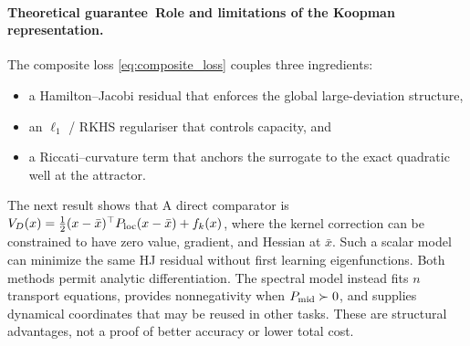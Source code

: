 \documentclass[11pt]{article}
\theoremstyle{plain}      %
\theoremstyle{definition} %
\providecommand{\DIFaddtex}[1]{{\protect\color{blue}#1}} %
\providecommand{\DIFdeltex}[1]{{\protect\color{red}#1}} %
\providecommand{\DIFaddbegin}{} %
\providecommand{\DIFaddend}{} %
\providecommand{\DIFdelbegin}{} %
\providecommand{\DIFdelend}{} %
\providecommand{\DIFadd}[1]{\texorpdfstring{\DIFaddtex{#1}}{#1}} %
\providecommand{\DIFdel}[1]{\texorpdfstring{\DIFdeltex{#1}}{}} %
\newcommand{\DIFscaledelfig}{1.0}
\newlength{\DIFdelgraphicswidth} %
\newlength{\DIFdelgraphicsheight} %
\newcommand{\DIFaddincludegraphics}[2][]{{\color{blue}\fbox{\DIFOincludegraphics[#1]{#2}}}} %
\newcommand{\DIFdelincludegraphics}[2][]{%
\sbox{\DIFdelgraphicsbox}{\DIFOincludegraphics[#1]{#2}}%
\settoboxwidth{\DIFdelgraphicswidth}{\DIFdelgraphicsbox} %
\settoboxtotalheight{\DIFdelgraphicsheight}{\DIFdelgraphicsbox} %
\scalebox{\DIFscaledelfig}{%
\parbox[b]{\DIFdelgraphicswidth}{\usebox{\DIFdelgraphicsbox}\\[-\baselineskip] \rule{\DIFdelgraphicswidth}{0em}}\llap{\resizebox{\DIFdelgraphicswidth}{\DIFdelgraphicsheight}{%
\setlength{\unitlength}{\DIFdelgraphicswidth}%
\begin{picture}(1,1)%
\thicklines\linethickness{2pt} %
{\color[rgb]{1,0,0}\put(0,0){\framebox(1,1){}}}%
{\color[rgb]{1,0,0}\put(0,0){\line( 1,1){1}}}%
{\color[rgb]{1,0,0}\put(0,1){\line(1,-1){1}}}%
\end{picture}%
}\hspace*{3pt}}} %
} %
\DeclareRobustCommand{\DIFaddbegin}{\DIFOaddbegin \let\includegraphics\DIFaddincludegraphics} %
\DeclareRobustCommand{\DIFaddend}{\DIFOaddend \let\includegraphics\DIFOincludegraphics} %
\DeclareRobustCommand{\DIFdelbegin}{\DIFOdelbegin \let\includegraphics\DIFdelincludegraphics} %
\DeclareRobustCommand{\DIFdelend}{\DIFOaddend \let\includegraphics\DIFOincludegraphics} %
\begin{document}
\paragraph{\DIFdelbegin \DIFdel{Theoretical guarantee}\DIFdelend\ \DIFaddbegin \DIFadd{Role and limitations of the Koopman representation}\DIFaddend .}\DIFdelbegin \DIFdel{The composite loss \eqref{eq:composite_loss} couples three ingredients:}%
\begin{itemize}%
\item[\DIFdel{i.}]%
\DIFdel{a Hamilton--Jacobi residual that enforces the global large-deviation
structure, }%
\item[\DIFdel{ii.}]%
\DIFdel{an $\ell_{1}$ / RKHS regulariser that controls capacity, and }%
\item[\DIFdel{iii.}]%
\DIFdel{a Riccati–curvature term that anchors the surrogate to the exact
quadratic well at the attractor. }
\end{itemize}%
\DIFdel{The next result shows that }\DIFdelend \DIFaddbegin \label{sec:koopman-role}
\DIFadd{A direct comparator is $V_D(x)=\tfrac12(x-\bar x)^\top P_{\rm loc}(x-\bar x)+f_k(x)$, where the kernel correction can be constrained to have zero value, gradient, and Hessian at $\bar x$. Such a scalar model can minimize the same HJ residual without first learning eigenfunctions. Both methods permit analytic differentiation. The spectral model instead fits $n$ transport equations, provides nonnegativity when $P_{\rm mid}\succ0$, and supplies dynamical coordinates that may be reused in other tasks. These are structural advantages, not a proof of better accuracy or lower total cost.
}
\end{document}
